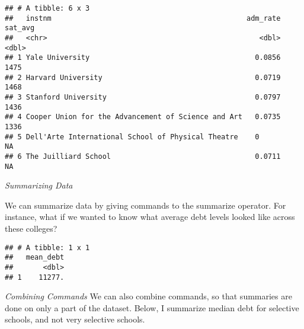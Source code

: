 \documentclass[
]{article}
\newenvironment{Shaded}{\begin{snugshade}}{\end{snugshade}}
\newcommand{\CommentTok}[1]{\textcolor[rgb]{0.56,0.35,0.01}{\textit{#1}}}
\newcommand{\DataTypeTok}[1]{\textcolor[rgb]{0.13,0.29,0.53}{#1}}
\newcommand{\DecValTok}[1]{\textcolor[rgb]{0.00,0.00,0.81}{#1}}
\newcommand{\KeywordTok}[1]{\textcolor[rgb]{0.13,0.29,0.53}{\textbf{#1}}}
\newcommand{\NormalTok}[1]{#1}
\newcommand{\OperatorTok}[1]{\textcolor[rgb]{0.81,0.36,0.00}{\textbf{#1}}}
\newcommand{\OtherTok}[1]{\textcolor[rgb]{0.56,0.35,0.01}{#1}}
\begin{document}
\begin{verbatim}
## # A tibble: 6 x 3
##   instnm                                              adm_rate sat_avg
##   <chr>                                                  <dbl>   <dbl>
## 1 Yale University                                       0.0856    1475
## 2 Harvard University                                    0.0719    1468
## 3 Stanford University                                   0.0797    1436
## 4 Cooper Union for the Advancement of Science and Art   0.0735    1336
## 5 Dell'Arte International School of Physical Theatre    0           NA
## 6 The Juilliard School                                  0.0711      NA
\end{verbatim}

\emph{Summarizing Data}

We can summarize data by giving commands to the summarize operator. For
instance, what if we wanted to know what average debt levels looked like
across these colleges?

\begin{Shaded}
\end{Shaded}

\begin{verbatim}
## # A tibble: 1 x 1
##   mean_debt
##       <dbl>
## 1    11277.
\end{verbatim}

\emph{Combining Commands} We can also combine commands, so that
summaries are done on only a part of the dataset. Below, I summarize
median debt for selective schools, and not very selective schools.

\begin{Shaded}
\end{Shaded}
\end{document}
